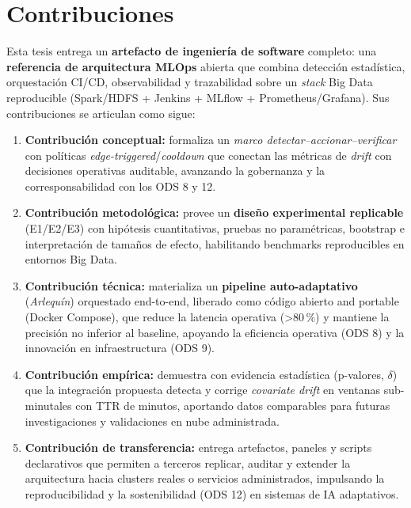 \section{Contribuciones}
\label{sec:contribuciones}
Esta tesis entrega un \textbf{artefacto de ingeniería de software} completo: una \textbf{referencia de arquitectura MLOps} abierta que combina detección estadística, orquestación CI/CD, observabilidad y trazabilidad sobre un \textit{stack} Big Data reproducible (Spark/HDFS + Jenkins + MLflow + Prometheus/Grafana). Sus contribuciones se articulan como sigue:
\begin{enumerate}\setlength\itemsep{2pt}
  \item \textbf{Contribución conceptual:} formaliza un \emph{marco detectar–accionar–verificar} con políticas \textit{edge-triggered}/\textit{cooldown} que conectan las métricas de \textit{drift} con decisiones operativas auditable, avanzando la gobernanza y la corresponsabilidad con los ODS 8 y 12.
  \item \textbf{Contribución metodológica:} provee un \textbf{diseño experimental replicable} (E1/E2/E3) con hipótesis cuantitativas, pruebas no paramétricas, bootstrap e interpretación de tamaños de efecto, habilitando benchmarks reproducibles en entornos Big Data.
  \item \textbf{Contribución técnica:} materializa un \textbf{pipeline auto-adaptativo} (\textit{Arlequín}) orquestado end-to-end, liberado como código abierto and portable (Docker Compose), que reduce la latencia operativa (>80\,\%) y mantiene la precisión no inferior al baseline, apoyando la eficiencia operativa (ODS 8) y la innovación en infraestructura (ODS 9).
  \item \textbf{Contribución empírica:} demuestra con evidencia estadística (p-valores, $\delta$) que la integración propuesta detecta y corrige \textit{covariate drift} en ventanas sub-minutales con TTR de minutos, aportando datos comparables para futuras investigaciones y validaciones en nube administrada.
  \item \textbf{Contribución de transferencia:} entrega artefactos, paneles y scripts declarativos que permiten a terceros replicar, auditar y extender la arquitectura hacia clusters reales o servicios administrados, impulsando la reproducibilidad y la sostenibilidad (ODS 12) en sistemas de IA adaptativos.
\end{enumerate}


